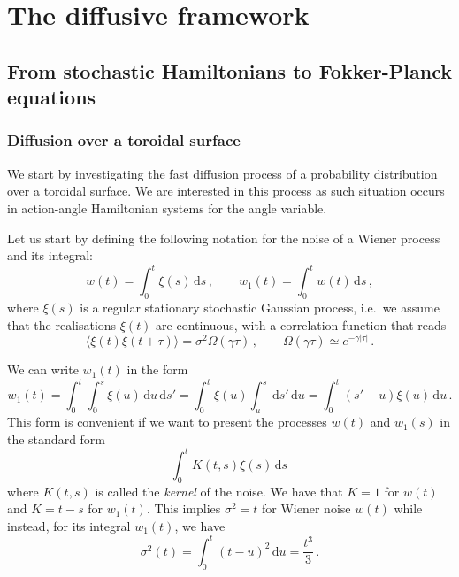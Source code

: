 
\chapter{The diffusive framework}\label{ch:the_diffusive_framework}




\section{From stochastic Hamiltonians to Fokker-Planck equations}

\subsection{Diffusion over a toroidal surface}
\label{subsec:diffusion-over-a-toroidal-surface}

We start by investigating the fast diffusion process of a probability distribution over a toroidal surface. We are interested in this process as such situation occurs in action-angle Hamiltonian systems for the angle variable.

Let us start by defining the following notation for the noise of a Wiener process and its integral:
\begin{equation}
	w(t) = \int_0^t \xi(s)\,\mathrm{d}s \,, \qquad w_1(t)=\int_0^t w(t)\,\mathrm{d}s \,,
\end{equation}
where $\xi(s)$ is a regular stationary stochastic Gaussian process, i.e.\ we assume that the realisations $\xi(t)$ are continuous, with a correlation function that reads
\begin{equation}
    \langle\xi(t)\xi(t+\tau)\rangle = \sigma^2 \Omega(\gamma\tau) \,,\qquad \Omega(\gamma\tau) \simeq e^{-\gamma|\tau|}\,.
\end{equation}

We can write \(w_1(t)\) in the form
\begin{equation}
	w_1(t) = \int_0^t \int_0^s \xi(u)\,\mathrm{d}u\,\mathrm{d}s' = \int_0^t \xi(u)\int_u^s\,\mathrm{d}s'\,\mathrm{d}u = \int_0^t (s'-u)\xi(u)\,\mathrm{d}u \,.
\end{equation}
This form is convenient if we want to present the processes \(w(t)\) and \(w_1(s)\) in the standard form 
\begin{equation}
	\int_0^t K(t,s)\xi(s)\,\mathrm{d}s \,
\end{equation}
where \(K(t,s)\) is called the \textit{kernel} of the noise. We have that \(K=1\) for \(w(t)\) and \(K=t-s\) for \(w_1(t)\). This implies \(\sigma^2 = t\) for Wiener noise \(w(t)\) while instead, for its integral \(w_1(t)\), we have
\begin{equation}
	\sigma^2(t) = \int_0^t (t-u)^2\,\mathrm{d}u = \frac{t^3}{3} \,.
\end{equation}

